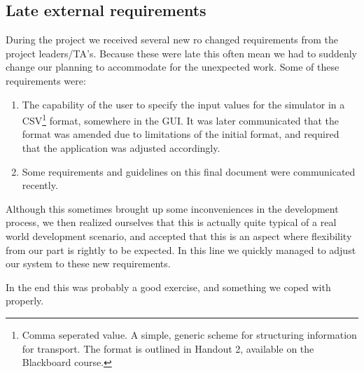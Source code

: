 \subsection{Late external requirements}
\label{late-requirements}
During the project we received several new ro changed requirements from the project leaders/TA's. Because these were late this often mean we had to suddenly change our planning to accommodate for the unexpected work. Some of these requirements were:
\begin{enumerate}
\item The capability of the user to specify the input values for the simulator in a CSV\footnote{Comma seperated value. A simple, generic scheme for structuring information for transport. The format is outlined in Handout 2, available on the Blackboard course.} format, somewhere in the GUI. It was later communicated that the format was amended due to limitations of the initial format, and required that the application was adjusted accordingly.
\item Some requirements and guidelines on this final document were communicated recently.
\end{enumerate}

\noindent Although this sometimes brought up some inconveniences in the development process, we then realized ourselves that this is actually quite typical of a real world development scenario, and accepted that this is an aspect where flexibility from our part is rightly  to be expected. In this line we quickly managed to adjust our system to these new requirements.

In the end this was probably a good exercise, and something we coped with properly.
